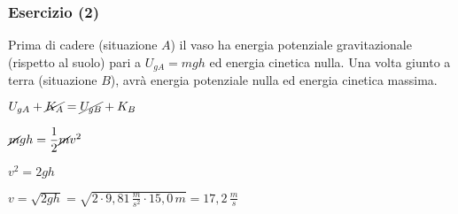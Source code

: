 \documentclass[]{beamer}
\theoremstyle{plain}
\begin{document}
\begin{frame}
  \frametitle{Esercizio (2)}
  Prima di cadere (situazione $ A $) il vaso ha energia potenziale gravitazionale (rispetto al suolo) pari a $ U_{gA} = mgh $ ed energia cinetica nulla. Una volta giunto a terra (situazione $ B $), avrà energia potenziale nulla ed energia cinetica massima.\pause
  \begin{center}
  $ U_{gA} + \cancel{K_A} = \cancel{U_{gB}} + K_B $
  \end{center}\pause
  \begin{center}
    $ \cancel{m}gh = \dfrac{1}{2}\cancel{m}v^2 $
  \end{center}\pause
  \begin{center}
  $ v^2 = 2gh $
  \end{center}\pause
  \begin{center}
  $ v = \sqrt{2gh} = \sqrt{2 \cdot 9,81 \, \frac{m}{s^2}\cdot 15,0 \, m} = 17,2 \, \frac{m}{s}$
  \end{center}
\end{frame}
\end{document}
